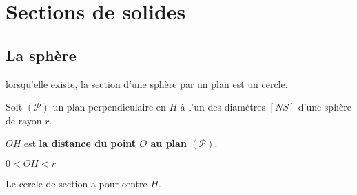 \section{Sections de solides}
\subsection{La sphère}
\begin{remarque}
    lorsqu'elle existe, la section d'une sphère par un plan est un cercle.
\end{remarque}

\begin{changemargin}{-5mm}{-5mm}
    \begin{propriete}
        Soit $(\mathcal{P})$ un plan perpendiculaire en $H$ à l'un des diamètres $[NS]$ d'une sphère de rayon $r$. 

        $OH$ est {\bf la distance du point $O$ au plan $(\mathcal{P})$}.
        \begin{multicols}{3}
        \centerline{\underline{$0<OH<r$}}
        \par Le cercle de section a pour centre $H$.


\end{multicols}
\end{propriete}
\end{changemargin}
